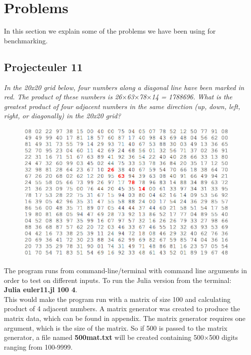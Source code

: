 \documentclass[a4paper, 11pt, titlepage]{article}
\begin{document}
\section{Problems}
In this section we explain some of the problems we have been using for benchmarking.
\subsection{Projecteuler 11}
\textit{In the 20x20 grid below, four numbers along a diagonal line have been marked in red. The product of these numbers is 26$\times$63$\times$78$\times$14 = 1788696. What is the greatest product of four adjacent numbers in the same direction (up, down, left, right, or diagonally) in the 20x20 grid?}
\begin{figure}[H]
	\begin{center}
	\includegraphics[scale=0.30]{image/11.jpg}
	\label{11}
	\end{center}
\end{figure}
The program runs from command-line/terminal with command line arguments in order to test on different inputs. To run the Julia version from the terminal: \\
\textbf{Julia euler11.jl 100 4}. \\
This would make the program run with a matrix of size 100 and calculating product of 4 adjacent numbers. A matrix generator was created to produce the matrix data,  which can be found in appendix. The matrix generator requires one argument, which is the size of the matrix. So if 500 is passed to the matrix generator, a file named \textbf{500mat.txt} will be created containing 500$\times$500 digits ranging from 100-9999.
\end{document}
